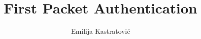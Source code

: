 \documentclass[vspaper,language=english]{acmart} %
\begin{document}
\title{First Packet Authentication}

\author{Emilija Kastratović}

\maketitle
{}









\appendix
{}


\end{document}
